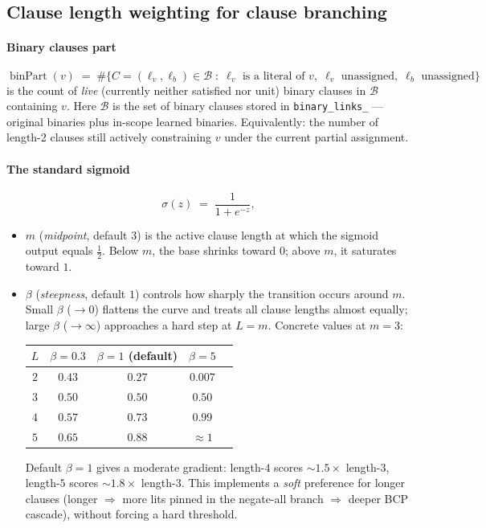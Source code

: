 \documentclass[11pt]{article}
\begin{document}
\subsection*{Clause length weighting for clause branching}

\paragraph{Binary clauses part}

\[
\operatorname{binPart}(v) \;=\;
\#\bigl\{ C = (\ell_v, \ell_b) \in \mathcal{B}
\;:\; \ell_v \text{ is a literal of } v,\;
\ell_v \text{ unassigned},\;
\ell_b \text{ unassigned} \bigr\}
\]
is the count of \emph{live} (currently neither satisfied nor unit) binary
clauses in $\mathcal{B}$ containing $v$. Here $\mathcal{B}$ is the set of
binary clauses stored in \texttt{binary\_links\_} --- original binaries plus
in-scope learned binaries.
Equivalently: the number of length-2 clauses still actively constraining $v$
under the current partial assignment.

\paragraph{The standard sigmoid}
\[
\sigma(z) \;=\; \frac{1}{1 + e^{-z}},
\]


\begin{itemize}
	\item $m$ (\emph{midpoint}, default $3$) is the active clause length at which
	the sigmoid output equals $\tfrac{1}{2}$. Below $m$, the base shrinks
	toward $0$; above $m$, it saturates toward $1$.
	\item $\beta$ (\emph{steepness}, default $1$) controls how sharply the
	transition occurs around $m$. Small $\beta$ ($\to 0$) flattens the
	curve and treats all clause lengths almost equally; large $\beta$
	($\to \infty$) approaches a hard step at $L = m$. Concrete values at
	$m = 3$:
	\begin{center}
		\begin{tabular}{ccccc}
			\toprule
			$L$ & $\beta = 0.3$ & $\beta = 1$ (default) & $\beta = 5$ \\
			\midrule
			$2$ & $0.43$ & $0.27$ & $0.007$ \\
			$3$ & $0.50$ & $0.50$ & $0.50$  \\
			$4$ & $0.57$ & $0.73$ & $0.99$  \\
			$5$ & $0.65$ & $0.88$ & $\approx 1$ \\
			\bottomrule
		\end{tabular}
	\end{center}
	Default $\beta = 1$ gives a moderate gradient: length-$4$ scores
	$\sim 1.5\times$ length-$3$, length-$5$ scores $\sim 1.8\times$ length-$3$.
	This implements a \emph{soft} preference for longer clauses
	(longer $\Rightarrow$ more lits pinned in the negate-all branch
	$\Rightarrow$ deeper BCP cascade), without forcing a hard threshold.
\end{itemize}
\end{document}
